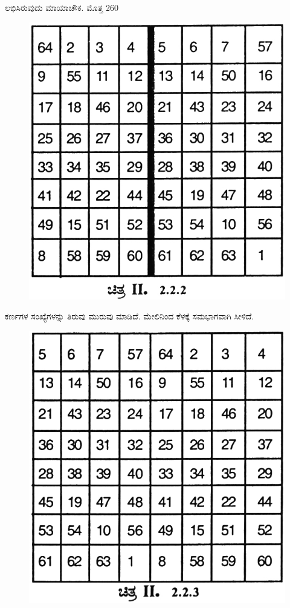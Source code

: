 \begin{itemize}
	ಲಭಿಸಿರುವುದು ಮಾಯಾಚೌಕ. ಮೊತ್ತ 260
	\begin{figure}[H]
	\includegraphics[scale=.9]{src/figures/chap3/fig3-21.jpg}
	\end{figure}
	ಕರ್ಣಗಳ ಸಂಖ್ಯೆಗಳನ್ನು ತಿರುವು ಮುರುವು ಮಾಡಿದೆ. ಮೇಲಿನಿಂದ ಕೆಳಕ್ಕೆ ಸಮ\-ಭಾಗವಾಗಿ ಸೀಳಿದೆ.
	\begin{figure}[H]
	\includegraphics[scale=.9]{src/figures/chap3/fig3-22.jpg}

\end{figure}
\end{itemize}
